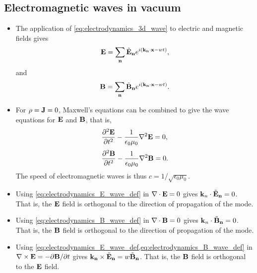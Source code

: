 \documentclass[a4paper,11pt]{report}
\begin{document}
\subsection{Electromagnetic waves in vacuum}
\begin{itemize}
    \item The application of \cref{eq:electrodynamics_3d_wave} to electric and magnetic fields gives 
    \begin{equation}
        \label{eq:electrodynamics_E_wave_def}
        \mathbf{E} = \sum_{\mathbf{n}} \tilde{\mathbf{E}}_{\mathbf{n}} e^{i \left ( \mathbf{k}_{\mathbf{n}} \cdot \mathbf{x} - wt \right )},
    \end{equation}
    and 
    \begin{equation}
        \label{eq:electrodynamics_B_wave_def}
        \mathbf{B} = \sum_{\mathbf{n}} \tilde{\mathbf{B}}_{\mathbf{n}} e^{i \left ( \mathbf{k}_{\mathbf{n}} \cdot \mathbf{x} - wt \right )}.
    \end{equation}
    \item For $\rho = \mathbf{J} = 0$, Maxwell's equations can be combined to give the wave equations for $\mathbf{E}$ and $\mathbf{B}$, that is,
    \begin{equation}
        \label{eq:electrodynamics_E_wave_eq}
        \frac{\partial^2 \mathbf{E}}{\partial t^2} - \frac{1}{\epsilon_0 \mu_0} \nabla^2 \mathbf{E} = 0,
    \end{equation}
    \begin{equation}
        \label{eq:electrodynamics_B_wave_eq}
        \frac{\partial^2 \mathbf{B}}{\partial t^2} - \frac{1}{\epsilon_0 \mu_0} \nabla^2 \mathbf{B} = 0.
    \end{equation}
    The speed of electromagnetic waves is thus $c=1/\sqrt{\epsilon_0 \mu_0}$.

    \item Using \cref{eq:electrodynamics_E_wave_def} in $\nabla \cdot \mathbf{E} = 0$ gives $\mathbf{k}_n \cdot \tilde{\mathbf{E}}_{\mathbf{n}} = 0$. That is, the $\mathbf{E}$ field is orthogonal to the direction of propagation of the mode.
    
    \item Using \cref{eq:electrodynamics_B_wave_def} in $\nabla \cdot \mathbf{B} = 0$ gives $\mathbf{k}_n \cdot \tilde{\mathbf{B}}_{\mathbf{n}} = 0$. That is, the $\mathbf{B}$ field is orthogonal to the direction of propagation of the mode.
    
    \item Using \cref{eq:electrodynamics_E_wave_def,eq:electrodynamics_B_wave_def} in $\nabla \times \mathbf{E} = -\partial \mathbf{B} / \partial t$ gives $\mathbf{k}_{\mathbf{n}} \times \tilde{\mathbf{E}}_{\mathbf{n}} = w \tilde{\mathbf{B}}_{\mathbf{n}}$. That is, the $\mathbf{B}$ field is orthogonal to the $\mathbf{E}$ field.

\end{itemize}



\end{document}
